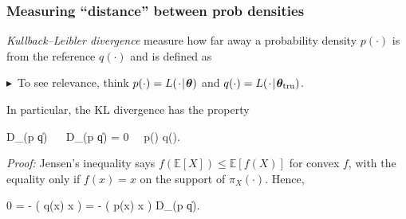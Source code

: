 \documentclass[18pt]{beamer}
\newcommand{\defineTightItemizeSpacing}{%
	\setlength{\abovedisplayskip}{.25\baselineskip}%
	\setlength{\belowdisplayskip}{.25\baselineskip}%
}
\newenvironment{tightEquation*}{%
	\defineTightItemizeSpacing%
	\begin{equation*}
}{
	\end{equation*} \ignorespacesafterend
}
\newcommand{\noteBullet}{\hspace*{.75em}\textcolor{themecolor}{$\blacktriangleright$}\ }
\newcommand{\given}{\thinnerspace | \thinnerspace}
\newcommand{\defeq}{\vcentcolon =} %
\newcommand{\diff}{\operatorname{\mathrm{d}}\!{}}
\newcommand{\thinnerspace}{\mskip.5\thinmuskip}
\newcommand{\thinnestspace}{\mskip.25\thinmuskip}
\newcommand{\expectation}{\mathbb{E}}
\newcommand{\kldivergence}{D_{\mathrm{KL}}}
\newcommand{\truthSub}{\mathrm{tru}}
\newcommand{\density}{\pi}
\newcommand{\likelihood}{L}
\newcommand{\btheta}{\bm{\theta}}
\begin{document}
\begin{frame}
\frametitle{Measuring ``distance'' between prob densities}
\textit{Kullback–Leibler divergence} measure how far away a probability density $p(\cdot)$ is from the reference $q(\cdot)$ and is defined as
\pause%
\noteBullet To see relevance, think $p(\cdot) = \likelihood(\thinnerspace \cdot \given \btheta)$ and $q(\cdot) = \likelihood(\thinnerspace \cdot \given \btheta_\truthSub)$.

\pause
\smallskip
In particular, the KL divergence has the property 
\begin{tightEquation*}
\kldivergence(p \| q) 
	\  \
	\kldivergence(p \| q) = 0 \,  \, p(\cdot) \equiv q(\cdot).
\end{tightEquation*}

\pause
\textit{Proof:} 
Jensen's inequality says $f(\expectation[X]) \leq \expectation[f(X)]$ for convex $f$, with the equality only if $f(x) = x$ on the support of $\density_X(\cdot)$. Hence,
\begin{tightEquation*}
0 = - \log\!\left( \int q(x) \diff x \right) \pause
	= - \log\!\left( \int {} p(x) \diff x \right) \pause
	\leq \kldivergence(p \| q).
\end{tightEquation*}
\end{frame}
\end{document}
